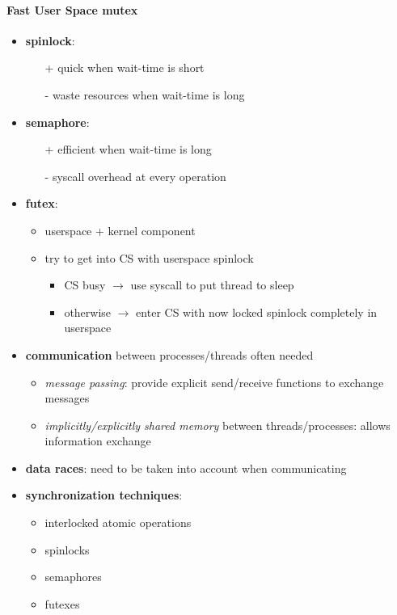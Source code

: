 \paragraph{Fast User Space mutex}
\begin{itemize}
  \item \textbf{spinlock}:
  \begin{itemize}
    \item[+] quick when wait-time is short
    \item[-] waste resources when wait-time is long
  \end{itemize}
  \item \textbf{semaphore}:
  \begin{itemize}
    \item[+] efficient when wait-time is long
    \item[-] syscall overhead at every operation
  \end{itemize}
  \item \textbf{futex}:
  \begin{itemize}
    \item userspace + kernel component
    \item try to get into CS with userspace spinlock
    \begin{itemize}
      \item CS busy \( \to \) use syscall to put thread to sleep
      \item otherwise \( \to \) enter CS with now locked spinlock completely in userspace
    \end{itemize}
  \end{itemize}
\end{itemize}

\begin{summary}
  \begin{itemize}
    \item \textbf{communication} between processes/threads often needed
    \begin{itemize}
      \item \emph{message passing}: provide explicit send/receive functions to exchange messages
      \item \emph{implicitly/explicitly shared memory} between threads/processes: allows information exchange
    \end{itemize}
    \item \textbf{data races}: need to be taken into account when communicating
    \item \textbf{synchronization techniques}:
    \begin{itemize}
      \item interlocked atomic operations
      \item spinlocks
      \item semaphores
      \item futexes
    \end{itemize}
  \end{itemize}
\end{summary}
